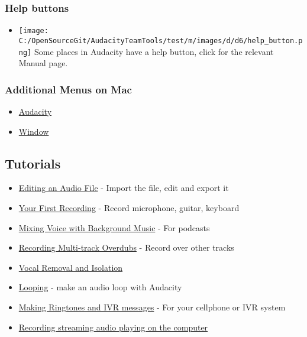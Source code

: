 \begin{multicols}{2}
\subsubsection{Help buttons}
\begin{itemize}
\item 
\texorpdfstring{\protect\texttt{[image: C:/OpenSourceGit/AudacityTeamTools/test/m/images/d/d6/help\_button.png]}}{}
 Some places in Audacity have a help button, click for the relevant Manual page.
\end{itemize}

\subsubsection{Additional Menus on Mac}
\begin{itemize}
\item 
\hyperref[\foo{man:audacity:menu:}]{Audacity}

\item 
\hyperref[\foo{man:window:menu:}]{Window}

\end{itemize}

\label{index:ref:bottom}
\subsection{Tutorials}
\label{index:tutorials}
\label{index:skiptheimage}
\begin{itemize}
\item 
\hyperref[\foo{man:tutorial:editing:an:existing:file:}]{Editing an Audio File}
 - Import the file, edit and export it
\item 
\hyperref[\foo{man:tutorial:your:first:recording:}]{Your First Recording}
 - Record microphone, guitar, keyboard
\item 
\hyperref[\foo{man:tutorial:mixing:a:narration:with:background:music:}]{Mixing Voice with Background Music}
 - For podcasts
\item 
\hyperref[\foo{man:tutorial:recording:multi:track:overdubs:}]{Recording Multi-track Overdubs}
 - Record over other tracks
\item 
\hyperref[\foo{man:tutorial:vocal:removal:and:isolation:}]{Vocal Removal and Isolation}

\item 
\hyperref[\foo{man:tutorial:looping:}]{Looping}
 - make an audio loop with Audacity
\item 
\hyperref[\foo{man:tutorial:making:ringtones:and:ivr:messages:}]{Making Ringtones and IVR messages}
 - For your cellphone or IVR system
\item 
\hyperref[\foo{man:tutorial:recording:audio:playing:on:the:computer:}]{Recording streaming audio playing on the computer}


\end{itemize}
\end{multicols}
